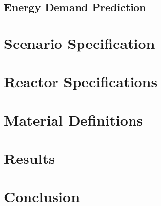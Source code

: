 \subsection{Energy Demand Prediction}

\section{Scenario Specification}

\section{Reactor Specifications}

\section{Material Definitions}

\section{Results}

\section{Conclusion}